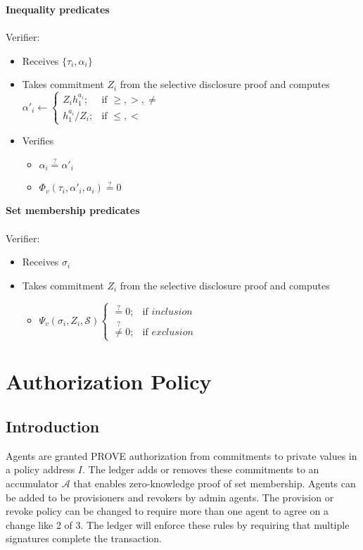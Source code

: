 \documentclass[a4paper]{article}
\begin{document}
\textbf{Inequality predicates}\\\\
Verifier:
\begin{itemize}
    \item Receives $\{\tau_i, \alpha_i\}$
    \item Takes commitment $Z_i$ from the selective disclosure proof and computes
        $\alpha'_i \leftarrow \begin{cases}
        Z_i h_1^{a_i};& \mbox{if } \geq, >, \neq\\
        h_1^{a_i}/Z_i;& \mbox{if } \leq, <
        \end{cases}$
    \item Verifies
    \begin{itemize}
        \item $\alpha_i \overset{\text{?}}{=}\alpha'_i$
        \item $\Phi_v(\tau_i, \alpha'_i, a_i)\overset{?}{=} 0$
    \end{itemize}
\end{itemize}
\textbf{Set membership predicates}\\\\
Verifier:
\begin{itemize}
    \item Receives $\sigma_i$
    \item Takes commitment $Z_i$ from the selective disclosure proof and computes
    \begin{itemize}
        \item $\Psi_v(\sigma_i, Z_i, \mathcal{S}) \begin{cases}
        \overset{?}{=} 0;&\mbox{if } inclusion\\
        \overset{?}{\neq} 0;&\mbox{if } exclusion
        \end{cases}$
    \end{itemize}
\end{itemize}
\section{Authorization Policy}
\subsection{Introduction}

Agents are granted PROVE authorization from commitments to private values in a policy address $I$. The ledger adds or removes these commitments to an accumulator $\mathcal{A}$ that enables zero-knowledge proof of set membership. Agents can be added to be provisioners and revokers by admin agents. The provision or revoke policy can be changed to require more than one agent to agree on a change like 2 of 3. The ledger will enforce these rules by requiring that multiple signatures complete the transaction.
\end{document}
